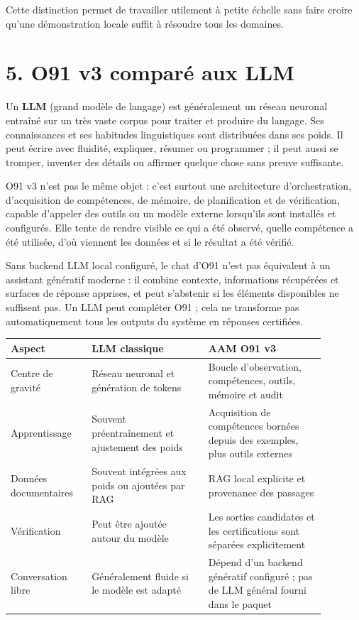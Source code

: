 \documentclass[11pt,a4paper]{article}
\begin{document}
Cette distinction permet de travailler utilement à petite échelle sans faire croire qu'une démonstration locale suffit à résoudre tous les domaines.

\section*{5. O91 v3 comparé aux LLM}

Un \textbf{LLM} (grand modèle de langage) est généralement un réseau neuronal entraîné sur un très vaste corpus pour traiter et produire du langage. Ses connaissances et ses habitudes linguistiques sont distribuées dans ses poids. Il peut écrire avec fluidité, expliquer, résumer ou programmer ; il peut aussi se tromper, inventer des détails ou affirmer quelque chose sans preuve suffisante.

O91 v3 n'est pas le même objet : c'est surtout une architecture d'orchestration, d'acquisition de compétences, de mémoire, de planification et de vérification, capable d'appeler des outils ou un modèle externe lorsqu'ils sont installés et configurés. Elle tente de rendre visible ce qui a été observé, quelle compétence a été utilisée, d'où viennent les données et si le résultat a été vérifié.

Sans backend LLM local configuré, le chat d'O91 n'est pas équivalent à un assistant génératif moderne : il combine contexte, informations récupérées et surfaces de réponse apprises, et peut s'abstenir si les éléments disponibles ne suffisent pas. Un LLM peut compléter O91 ; cela ne transforme pas automatiquement tous les outputs du système en réponses certifiées.

\begin{center}
\begin{tabular}{>{\raggedright\arraybackslash}p{0.22\linewidth} >{\raggedright\arraybackslash}p{0.33\linewidth} >{\raggedright\arraybackslash}p{0.33\linewidth}}
\toprule
\textbf{Aspect} & \textbf{LLM classique} & \textbf{AAM O91 v3} \\
\midrule
Centre de gravité & Réseau neuronal et génération de tokens & Boucle d'observation, compétences, outils, mémoire et audit \\
Apprentissage & Souvent préentraînement et ajustement des poids & Acquisition de compétences bornées depuis des exemples, plus outils externes \\
Données documentaires & Souvent intégrées aux poids ou ajoutées par RAG & RAG local explicite et provenance des passages \\
Vérification & Peut être ajoutée autour du modèle & Les sorties candidates et les certifications sont séparées explicitement \\
Conversation libre & Généralement fluide si le modèle est adapté & Dépend d'un backend génératif configuré ; pas de LLM général fourni dans le paquet \\
\bottomrule
\end{tabular}
\end{center}
\end{document}
